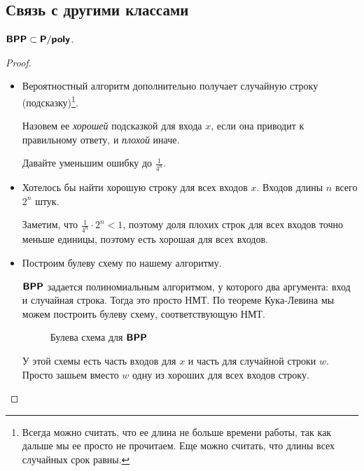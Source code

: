 \subsection{Связь с другими классами}
\begin{thm}
	$ \textmd{\textbf{\textsf{BPP}}} \subset \textmd{\textbf{\textsf{P}}}/\textmd{\textbf{\textsf{poly}}}$.
\end{thm}
\begin{proof}
	\begin{itemize}
		\item
			Вероятностный алгоритм дополнительно получает случайную строку (подсказку)\footnote{Всегда можно считать, что ее длина не больше времени работы, так как дальше мы ее просто не прочитаем.
			Еще можно считать, что длины всех случайных срок равны.}.
			
			Назовем ее \textit{хорошей} подсказкой для входа $ x$, если она приводит к правильному ответу, и \textit{плохой} иначе.

			Давайте уменьшим ошибку до $ \frac{1}{4^{n}}$. %

		\item
			Хотелось бы найти хорошую строку для всех входов $ x$. Входов длины $ n$ всего $ 2^{n}$ штук.

			Заметим, что $ \frac{1}{4^{n}} \cdot 2^{n} < 1$, поэтому доля плохих строк для всех входов точно меньше единицы, поэтому есть хорошая для всех входов.

		\item
			Построим булеву схему по нашему алгоритму.

			$ \textmd{\textbf{\textsf{BPP}}}$ задается полиномиальным алгоритмом, у которого два аргумента: вход и случайная строка.
			Тогда это просто НМТ. По теореме Кука-Левина мы можем построить булеву схему, соответствующую НМТ.
			\begin{figure}[ht]
				\centering
				\caption{Булева схема для $ \textmd{\textbf{\textsf{BPP}}}$}
				\label{fig:random-bpp}
			\end{figure}
			У этой схемы есть часть входов для $ x$ и часть для случайной строки $ w$. Просто зашьем вместо  $ w$ одну из хороших для всех входов строку.
	\end{itemize}
\end{proof}

